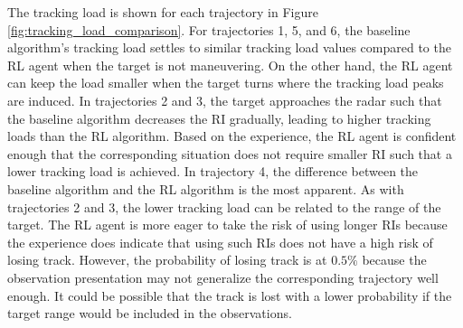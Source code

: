 \documentclass[english, 12pt, a4paper, elec, utf8, a-1b, online]{aaltothesis}
\begin{document}
The tracking load is shown for each trajectory in Figure \ref{fig:tracking_load_comparison}.
For trajectories 1, 5, and 6, the baseline algorithm's tracking load settles to similar tracking load values compared to the RL agent when the target is not maneuvering.
On the other hand, the RL agent can keep the load smaller when the target turns where the tracking load peaks are induced.
In trajectories 2 and 3, the target approaches the radar such that the baseline algorithm decreases the RI gradually, leading to higher tracking loads than the RL algorithm.
Based on the experience, the RL agent is confident enough that the corresponding situation does not require smaller RI such that a lower tracking load is achieved.
In trajectory 4, the difference between the baseline algorithm and the RL algorithm is the most apparent.
As with trajectories 2 and 3, the lower tracking load can be related to the range of the target.
The RL agent is more eager to take the risk of using longer RIs because the experience does indicate that using such RIs does not have a high risk of losing track.
However, the probability of losing track is at $0.5\%$ because the observation presentation may not generalize the corresponding trajectory well enough.
It could be possible that the track is lost with a lower probability if the target range would be included in the observations.
\end{document}
